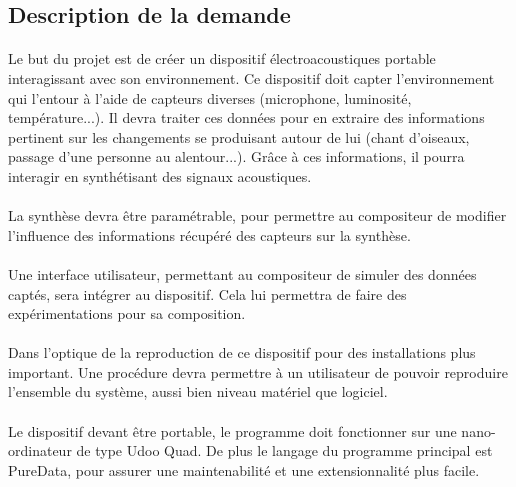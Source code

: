 \documentclass[a4paper, titlepage, oneside, 12pt]{article}%
\begin{document}
\subsection{Description de la demande}

\paragraph{}
Le but du projet est de créer un dispositif électroacoustiques portable interagissant avec son environnement.
Ce dispositif doit capter l'environnement qui l'entour à l'aide de capteurs diverses (microphone, luminosité, température...). 
Il devra traiter ces données pour en extraire des informations pertinent sur les changements se produisant autour de lui (chant d'oiseaux, passage d'une personne au alentour...).
Grâce à ces informations, il pourra interagir en synthétisant des signaux acoustiques.

\paragraph{}
La synthèse devra être paramétrable, pour permettre au compositeur de modifier l’influence des informations récupéré des capteurs sur la synthèse.

\paragraph{}
Une interface utilisateur, permettant au compositeur de simuler des données captés, sera intégrer au dispositif. Cela lui permettra de faire des expérimentations pour sa composition.\\

\paragraph{}
Dans l'optique de la reproduction de ce dispositif pour des installations plus important. Une procédure devra permettre à un utilisateur de pouvoir reproduire l'ensemble du système, aussi bien niveau matériel que logiciel.

\paragraph{}
Le dispositif devant être portable, le programme doit fonctionner sur une nano-ordinateur de type Udoo Quad. De plus le langage du programme principal est PureData, pour assurer une maintenabilité et une extensionnalité plus facile.
\end{document}
